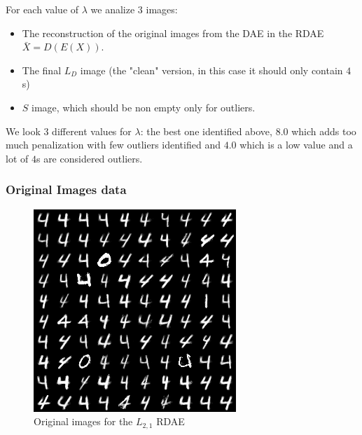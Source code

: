 \documentclass{beamer}
\theoremstyle{plain}
\theoremstyle{definition}
\theoremstyle{remark}
\begin{document}
\begin{frame}
	For each value of $\lambda$ we analize $3$ images:
	\begin{itemize}
		\item The reconstruction of the original images from the DAE in the RDAE $\bar{X} = D(E(X))$.
		\item The final $L_D$ image (the "clean" version, in this case it should only contain $4$s) 
		\item $S$ image, which should be non empty only for outliers.
	\end{itemize}
	We look $3$ different values for $\lambda$: the best one identified above, $8.0$ which adds too much penalization with few outliers identified and $4.0$ which is a low value and a lot of $4$s are considered outliers.
\end{frame}

\begin{frame}
	\frametitle{Original Images data}
	\begin{figure}
		\centering
		\includegraphics[width=0.5\linewidth]{Images/original_l21.png}
		\caption[]{Original images for the $L_{2,1}$ RDAE}
	\end{figure}
\end{frame}
\end{document}
